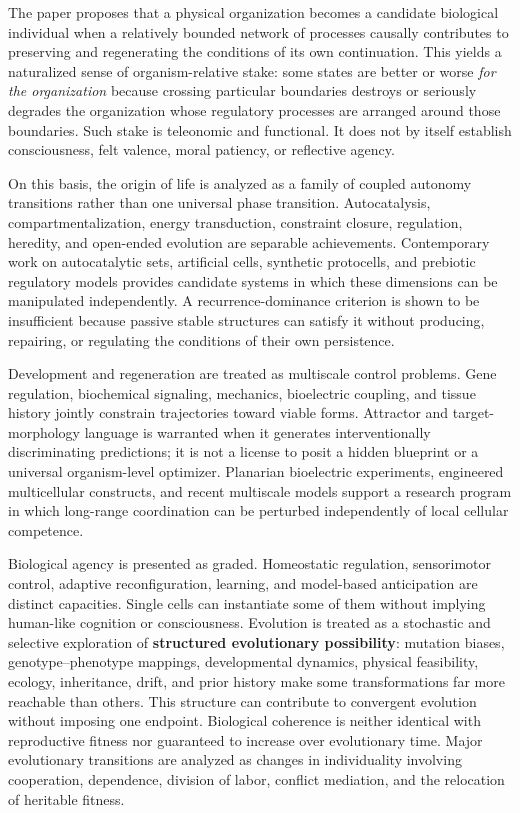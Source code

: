 \documentclass[
  11pt,
]{article}
\begin{document}
The paper proposes that a physical organization becomes a candidate
biological individual when a relatively bounded network of processes
causally contributes to preserving and regenerating the conditions of
its own continuation. This yields a naturalized sense of
organism-relative stake: some states are better or worse \emph{for the
organization} because crossing particular boundaries destroys or
seriously degrades the organization whose regulatory processes are
arranged around those boundaries. Such stake is teleonomic and
functional. It does not by itself establish consciousness, felt valence,
moral patiency, or reflective agency.

On this basis, the origin of life is analyzed as a family of coupled
autonomy transitions rather than one universal phase transition.
Autocatalysis, compartmentalization, energy transduction, constraint
closure, regulation, heredity, and open-ended evolution are separable
achievements. Contemporary work on autocatalytic sets, artificial cells,
synthetic protocells, and prebiotic regulatory models provides candidate
systems in which these dimensions can be manipulated independently. A
recurrence-dominance criterion is shown to be insufficient because
passive stable structures can satisfy it without producing, repairing,
or regulating the conditions of their own persistence.

Development and regeneration are treated as multiscale control problems.
Gene regulation, biochemical signaling, mechanics, bioelectric coupling,
and tissue history jointly constrain trajectories toward viable forms.
Attractor and target-morphology language is warranted when it generates
interventionally discriminating predictions; it is not a license to
posit a hidden blueprint or a universal organism-level optimizer.
Planarian bioelectric experiments, engineered multicellular constructs,
and recent multiscale models support a research program in which
long-range coordination can be perturbed independently of local cellular
competence.

Biological agency is presented as graded. Homeostatic regulation,
sensorimotor control, adaptive reconfiguration, learning, and
model-based anticipation are distinct capacities. Single cells can
instantiate some of them without implying human-like cognition or
consciousness. Evolution is treated as a stochastic and selective
exploration of \textbf{structured evolutionary possibility}: mutation
biases, genotype--phenotype mappings, developmental dynamics, physical
feasibility, ecology, inheritance, drift, and prior history make some
transformations far more reachable than others. This structure can
contribute to convergent evolution without imposing one endpoint.
Biological coherence is neither identical with reproductive fitness nor
guaranteed to increase over evolutionary time. Major evolutionary
transitions are analyzed as changes in individuality involving
cooperation, dependence, division of labor, conflict mediation, and the
relocation of heritable fitness.
\end{document}
